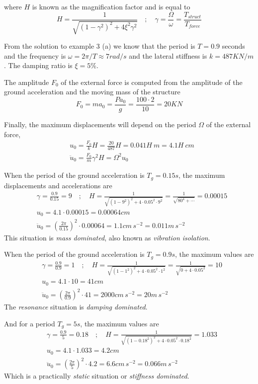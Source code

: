 \documentclass{problems}
\begin{document}
where $H$ is known as the magnification factor and is equal to
$$
H = \frac{1}{\sqrt{(1-\gamma^2)^2 + 4\xi^2\gamma^2}} \quad ; \quad
\gamma = \frac{\Omega}{\omega} = \frac{T_{struct}}{T_{force}}
$$

From the solution to example 3 (a) we know that the period is $T=0.9$ seconds and the frequency is $\omega = 2\pi/T \approx 7rad/s$ and the lateral stiffness is $k=487KN/m$. The damping ratio is $\xi=5\%$.

The amplitude $F_0$ of the external force is computed from the amplitude of the ground acceleration and the moving mass of the structure
$$
F_0 = ma_{0} = \frac{Pa_0}{g} = \frac{100\cdot2}{10} = 20KN
$$

Finally, the maximum displacements will depend on the period $\Omega$ of the external force,
\begin{align*}
&u_0 = \frac{F_0}{k}H = \frac{20}{487}H = 0.041H\ m = 4.1H\ cm \\
&\ddot{u}_0 = \frac{F_0}{m}\gamma^2H = \Omega^2u_0
\end{align*}


When the period of the ground acceleration is $T_g=0.15s$, the maximum displacements and accelerations are
\begin{align*}
&\gamma = \frac{0.9}{0.15} = 9 \quad ; \quad
H = \frac{1}{\sqrt{(1-9^2)^2 + 4\cdot 0.05^2\cdot 9^2}} = \frac{1}{\sqrt{80^4 + \cdots}} = 0.00015 \\
&u_0 = 4.1\cdot 0.00015 = 0.00064 cm \\
&\ddot{u}_0 = \left(\frac{2\pi}{0.15}\right)^2 \cdot 0.00064 = 1.1cm\,s^{-2} = 0.011m\,s^{-2}
\end{align*}
This situation is \emph{mass dominated}, also known as \emph{vibration isolation}.

When the period of the ground acceleration is $T_g=0.9s$, the maximum values are
\begin{align*}
&\gamma = \frac{0.9}{0.9} = 1 \quad ; \quad
H = \frac{1}{\sqrt{(1-1^2)^2 + 4\cdot 0.05^2\cdot 1^2}} = \frac{1}{\sqrt{0 + 4\cdot 0.05^2}} = 10 \\
&u_0 = 4.1\cdot 10 = 41 cm \\
&\ddot{u}_0 = \left(\frac{2\pi}{0.9}\right)^2 \cdot 41 = 2000cm\,s^{-2} = 20m\,s^{-2}
\end{align*}
The \emph{resonance} situation is \emph{damping dominated}.

And for a period $T_g=5s$, the maximum values are
\begin{align*}
&\gamma = \frac{0.9}{5} = 0.18 \quad ; \quad
H = \frac{1}{\sqrt{(1-0.18^2)^2 + 4\cdot 0.05^2\cdot 0.18^2}} = 1.033 \\
&u_0 = 4.1\cdot 1.033 = 4.2 cm \\
&\ddot{u}_0 = \left(\frac{2\pi}{5}\right)^2 \cdot 4.2 = 6.6cm\,s^{-2} = 0.066m\,s^{-2}
\end{align*}
Which is a practically \emph{static} situation or \emph{stiffness dominated}.
\end{document}

